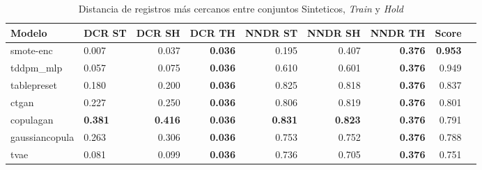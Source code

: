 \begin{table}[H]
\centering
\caption{Distancia de registros más cercanos entre conjuntos Sinteticos, \emph{Train} y \emph{Hold}}
\label{table-dcr-king county-a-2}
\begin{tabular}{|l|l|r|r|r|r|r|r|r|}
\hline
\rowcolor[gray]{0.8}
Modelo & DCR ST & DCR SH & DCR TH & NNDR ST & NNDR SH & NNDR TH & \textbf{Score} \\
\hline smote-enc & \cellcolor[rgb]{0.9, 0.54, 0.52} 0.007 & \cellcolor[rgb]{0.9, 0.54, 0.52} 0.037 & \bfseries 0.036 & 0.195 & 0.407 & \bfseries 0.376 & \bfseries 0.953 \\
\hline tddpm\_mlp & 0.057 & 0.075 & \bfseries 0.036 & 0.610 & 0.601 & \bfseries 0.376 & 0.949 \\
\hline tablepreset & 0.180 & 0.200 & \bfseries 0.036 & 0.825 & 0.818 & \bfseries 0.376 & 0.837 \\
\hline ctgan & 0.227 & 0.250 & \bfseries 0.036 & 0.806 & 0.819 & \bfseries 0.376 & 0.801 \\
\hline copulagan & \bfseries 0.381 & \bfseries 0.416 & \bfseries 0.036 & \bfseries 0.831 & \bfseries 0.823 & \bfseries 0.376 & 0.791 \\
\hline gaussiancopula & 0.263 & 0.306 & \bfseries 0.036 & 0.753 & 0.752 & \bfseries 0.376 & 0.788 \\
\hline tvae & 0.081 & 0.099 & \bfseries 0.036 & 0.736 & 0.705 & \bfseries 0.376 & 0.751 \\
\hline
\end{tabular}
\end{table}
